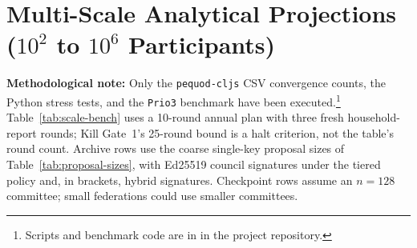 \documentclass[10pt,twoside,openany]{book}
\theoremstyle{dpepstyle}
\begin{document}
\section{Multi-Scale Analytical Projections ($10^2$ to $10^6$ Participants)}
\label{sec:scale}

{\small\color{SlateDark} \textbf{Methodological note:} Only the \texttt{pequod-cljs} CSV convergence counts, the Python stress tests, and the \texttt{Prio3} benchmark have been executed.\footnote{Scripts and benchmark code are in  in the project repository.} Table~\ref{tab:scale-bench} uses a 10-round annual plan with three fresh household-report rounds; Kill Gate~1's 25-round bound is a halt criterion, not the table's round count. Archive rows use the coarse single-key proposal sizes of Table~\ref{tab:proposal-sizes}, with Ed25519 council signatures under the tiered policy and, in brackets, hybrid signatures. Checkpoint rows assume an $n=128$ committee; small federations could use smaller committees.}
\end{document}
